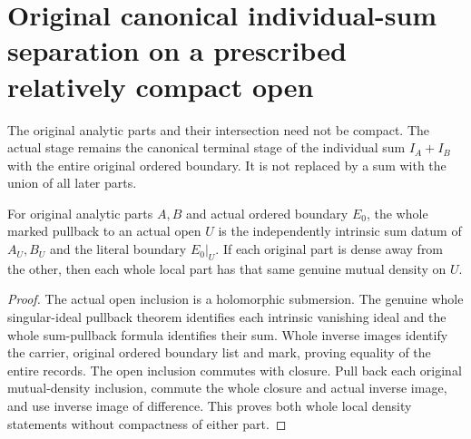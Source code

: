 \section{Original canonical individual-sum separation on a prescribed relatively compact open}
\label{sec:hironaka-original-local-canonical-sum-separation}

The original analytic parts and their intersection need not be compact.
The actual stage remains the canonical terminal stage of the individual
sum $I_A+I_B$ with the entire original ordered boundary. It is not
replaced by a sum with the union of all later parts.

\begin{theorem}
\label{hir:original-local-canonical-sum-whole-open-data}
For original analytic parts $A,B$ and actual ordered boundary $E_0$,
the whole marked pullback to an actual open $U$ is the independently
intrinsic sum datum of $A_U,B_U$ and the literal boundary $E_0|_U$.
If each original part is dense away from the other, then each whole
local part has that same genuine mutual density on $U$.
\leanok
\end{theorem}
\begin{proof}
The actual open inclusion is a holomorphic submersion. The genuine
whole singular-ideal pullback theorem identifies each intrinsic
vanishing ideal and the whole sum-pullback formula identifies their
sum. Whole inverse images identify the carrier, original ordered
boundary list and mark, proving equality of the entire records.
The open inclusion commutes with closure. Pull back each original
mutual-density inclusion, commute the whole closure and actual
inverse image, and use inverse image of difference. This proves both
whole local density statements without compactness of either part.
\end{proof}


